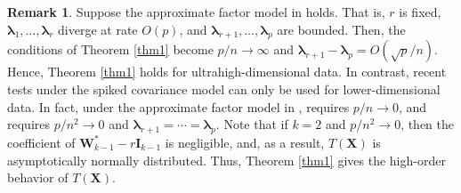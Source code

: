 \documentclass[12pt]{article} %
\newcommand{\bX}{\mathbf{X}}
\newcommand{\bI}{\mathbf{I}}
\newcommand{\bW}{\mathbf{W}}
\newcommand{\bfsym}[1]{\ensuremath{\boldsymbol{#1}}}
\def\blambda {\bfsym {\lambda}}
\theoremstyle{definition}
\newtheorem{remark}{Remark}
\begin{document}
\begin{remark}
    Suppose the approximate factor model in \cite{Fan2013Large} holds.
    That is, $r$ is fixed, $\blambda_1,\ldots, \blambda_r$ diverge at rate $O(p)$, and $\blambda_{r+1},\ldots, \blambda_p$ are bounded.
    Then, the conditions of Theorem \ref{thm1} become $p/n\to \infty$ and $\blambda_{r+1}-\blambda_p=O(\sqrt p /n)$.
    Hence, Theorem \ref{thm1} holds for ultrahigh-dimensional data.
    In contrast, recent tests under the spiked covariance model can only be used for lower-dimensional data.
    In fact, under the approximate factor model in \cite{Fan2013Large}, \cite{Aoshima2018} requires $p/n \to 0$, and \cite{WANG2018225} requires $p/n^2\to 0$ and $\blambda_{r+1}=\cdots=\blambda_p$.   
    Note that if $k=2$ and $p/n^2 \to 0$, then the coefficient of $\bW_{k-1}^* - r\bI_{k-1}$ is negligible, and, as a result, $T(\bX)$ is asymptotically normally distributed.
    Thus, Theorem \ref{thm1} gives the high-order behavior of $T(\bX)$.

\end{remark}
\end{document}
